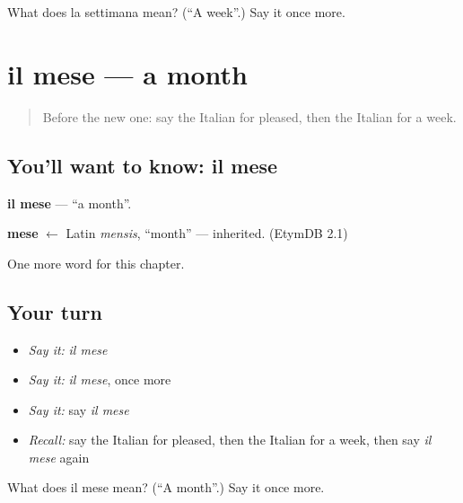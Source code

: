 \begin{tcolorbox}[breakable,colback=teal!4,colframe=teal!35!black,title={Before you move on}]
What does la settimana mean? (\textquotedblleft{}A week\textquotedblright{}.) Say it once more.
\end{tcolorbox}
\section[il mese]{il mese — a month}

\label{lesson:IT-C78-mese}



\begin{quote}
Before the new one: say the Italian for pleased, then the Italian for a week.
\end{quote}

\subsection*{You'll want to know: il mese}
\textbf{il mese} — \textquotedblleft{}a month\textquotedblright{}.

\begin{cousinweb}
\textbf{mese} $\leftarrow$ Latin \emph{mensis}, \textquotedblleft{}month\textquotedblright{} — inherited. (EtymDB 2.1)
\end{cousinweb}

\begin{grammarlens}[title={What you've built}]
One more word for this chapter.
\end{grammarlens}

\subsection*{Your turn}
\begin{itemize}
\raggedright
  \item \emph{Say it:} \emph{il mese}
  \item \emph{Say it:} \emph{il mese}, once more
  \item \emph{Say it:} say \emph{il mese}
  \item \emph{Recall:} say the Italian for pleased, then the Italian for a week, then say \emph{il mese} again
\end{itemize}

\begin{tcolorbox}[breakable,colback=teal!4,colframe=teal!35!black,title={Before you move on}]
What does il mese mean? (\textquotedblleft{}A month\textquotedblright{}.) Say it once more.
\end{tcolorbox}
